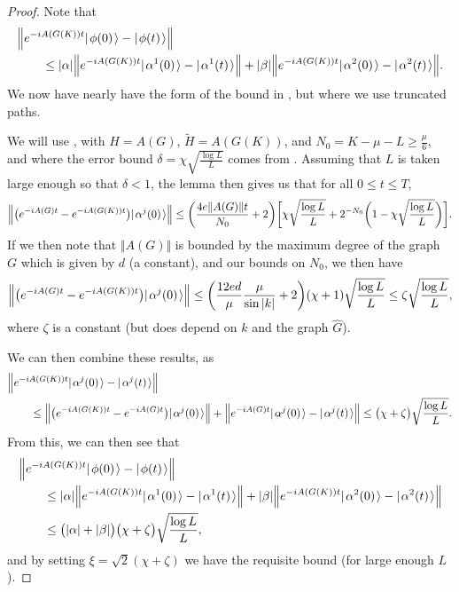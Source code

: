 \documentclass[../thesis-main/thesis-main]{subfiles}
\begin{document}
\begin{proof}
Note that
\begin{align}
  &\Big\Vert e^{-i A(G(K))t} |\mspace{2mu} \phi(0) \mspace{2mu} \rangle - |\mspace{2mu} \phi(t) \mspace{2mu} \rangle \Big\Vert \nonumber\\
  &\qquad\leq |\alpha| \Big\Vert e^{-i A(G(K))t} |\mspace{2mu} \alpha^1(0) \mspace{2mu} \rangle - |\mspace{2mu} \alpha^1(t) \mspace{2mu} \rangle\Big\Vert
  + |\beta| \Big\Vert e^{-i A(G(K))t}  |\mspace{2mu} \alpha^2(0) \mspace{2mu} \rangle - |\mspace{2mu} \alpha^2(t) \mspace{2mu} \rangle\Big\Vert .
\end{align}
We now have nearly have the form of the bound in , but where we use truncated paths.  

We will use , with $H = A(G)$, $\tilde{H} = A(G(K))$, and $N_0 = K - \mu - L \geq \frac{\mu}{6}$, and where the error bound $\delta = \chi \sqrt{\frac{\log L}{L}}$ comes from .  Assuming that $L$ is taken large enough so that $\delta < 1$, the lemma then gives us that for all $0 \leq t \leq T$,
\begin{align}
  \Big \Vert \big(e^{- i A(G) t} - e^{- i A(G(K))t}\big)|\mspace{2mu} \alpha^j(0) \mspace{2mu} \rangle\Big\Vert \leq \bigg( \frac{4 e \Vert A(G) \Vert t}{N_0} + 2 \bigg) \bigg[ \chi \sqrt{\frac{\log L}{L}} + 2^{-N_0} \bigg(1 -   \chi \sqrt{\frac{\log L}{L}}  \bigg)\bigg].
\end{align}
If we then note that $\Vert A(G)\Vert$ is bounded by the maximum degree of the graph $G$ which is given by $d$ (a constant), and our bounds on $N_0$, we then have 
 \begin{align}
  \Big \Vert \big(e^{- i A(G) t} - e^{- i A(G(K))t}\big)|\mspace{2mu} \alpha^j(0) \mspace{2mu} \rangle\Big\Vert \leq \bigg( \frac{12 e d }{\mu }\frac{\mu}{\sin |k|} + 2 \bigg)  (\chi +1)\sqrt{\frac{\log L}{L}}  \leq \zeta \sqrt{\frac{\log L}{L}}, 
\end{align}
where $\zeta$ is a constant (but does depend on $k$ and the graph $\widehat{G}$).

We can then combine these results, as
\begin{align}
  &\Big\Vert e^{-i A(G(K))t}  |\mspace{2mu} \alpha^j(0) \mspace{2mu} \rangle - |\mspace{2mu} \alpha^j(t) \mspace{2mu} \rangle\Big\Vert \nonumber \\
  &\qquad\leq \Big\Vert\big( e^{-i A(G(K))t}  - e^{- i A(G) t}\big)|\mspace{2mu} \alpha^j(0) \mspace{2mu} \rangle \Big\Vert  + \Big\Vert e^{-i A(G)t}  |\mspace{2mu} \alpha^j(0) \mspace{2mu} \rangle - |\mspace{2mu} \alpha^j(t) \mspace{2mu} \rangle\Big\Vert   \leq \big(\chi + \zeta \big) \sqrt{\frac{\log L}{L}}.
\end{align}
From this, we can then see that
\begin{align}
  &\Big\Vert e^{-i A(G(K))t} |\mspace{2mu} \phi(0) \mspace{2mu} \rangle - |\mspace{2mu} \phi(t) \mspace{2mu} \rangle \Big\Vert \nonumber\\
  &\qquad\leq |\alpha| \Big\Vert e^{-i A(G(K))t} |\mspace{2mu} \alpha^1(0) \mspace{2mu} \rangle - |\mspace{2mu} \alpha^1(t) \mspace{2mu} \rangle\Big\Vert
  + |\beta| \Big\Vert e^{-i A(G(K))t}  |\mspace{2mu} \alpha^2(0) \mspace{2mu} \rangle - |\mspace{2mu} \alpha^2(t) \mspace{2mu} \rangle\Big\Vert \\
  & \qquad \leq \big( |\alpha| + |\beta| \big) \big( \chi + \zeta \big)  \sqrt{\frac{\log L}{L}},
\end{align}
and by setting $\xi = \sqrt{2}(\chi + \zeta)$ we have the requisite bound (for large enough $L$).


\end{proof}
\end{document}

